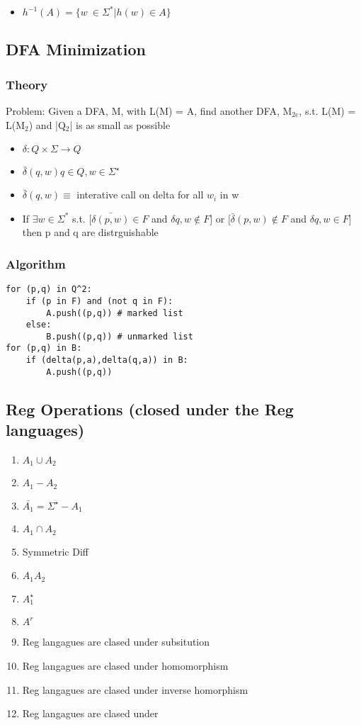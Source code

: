 \documentclass[11pt]{article}
\begin{document}
\begin{itemize}
\item $h^{-1}(A) = \{w\ \in \Sigma^* | h(w) \in A\}$
\end{itemize}
\subsection{DFA Minimization}
\label{sec-2.7}

\subsubsection{Theory}
\label{sec-2.7.1}

   Problem: Given a DFA, M, with L(M) = A, find another DFA, M$_{\mathrm{2c}}$,
   s.t. L(M) = L(M$_2$) and |Q$_2$| is as small as possible\\
\begin{itemize}
\item $\delta: Q \times \Sigma \rightarrow Q$
\item $\bar{\delta}(q,w) q\in Q, w\in \Sigma^{\star}$
\item $\bar{\delta}(q,w) \equiv$ interative call on delta for all $w_i$
     in w
\item If $\exists w \in \Sigma^*$ s.t. $[\bar{\delta(p,w)} \in F$ and
     $\delta{q,w} \notin F]$ or $[\bar{\delta}(p,w) \notin F$ and $\delta{q,w} \in F]$ then p and q are distrguishable
\end{itemize}
\subsubsection{Algorithm}
\label{sec-2.7.2}


\begin{verbatim}
for (p,q) in Q^2:
    if (p in F) and (not q in F):
        A.push((p,q)) # marked list
    else:
        B.push((p,q)) # unmarked list
for (p,q) in B:
    if (delta(p,a),delta(q,a)) in B:
        A.push((p,q))
\end{verbatim}


\subsection{Reg Operations (closed under the Reg languages)}
\label{sec-2.8}

\begin{enumerate}
\item $A_1 \cup A_2$
\item $A_1 - A_2$
\item $\bar{A_1} = \Sigma^{\star} - A_1$
\item $A_1 \cap A_2$
\item Symmetric Diff
\item $A_1 A_2$
\item $A_1^{\star}$
\item $A^r$
\item Reg langagues are clased under subsitution
\item Reg langagues are clased under homomorphism
\item Reg langagues are clased under inverse homorphism
\item Reg langagues are clased under
\end{enumerate}
\end{document}
